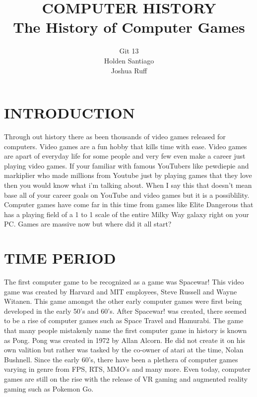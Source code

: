 \documentclass[letterpaper, 10 pt, conference]{IEEEconf}
\title{\LARGE \bf
COMPUTER HISTORY\\
\large The History of Computer Games
}
\author{Git 13\\
\small Holden Santiago\\
\small Joshua Ruff\\
}
\begin{document}
\maketitle
\thispagestyle{empty}
\pagestyle{empty}

\section{INTRODUCTION}
	Through out history there as been thousands of video games released for computers. Video games are a fun hobby that kills time with ease. Video games are apart of everyday life for some people and very few even make a career just playing video games. If your familiar with famous YouTubers like pewdiepie and markiplier who made millions from Youtube just by playing games that they love then you would know what i'm talking about. When I say this that doesn't mean base all of your career goals on YouTube and video games but it is a possiblility. Computer games have come far in this time from games like Elite Dangerous that has a playing field of a 1 to 1 scale of the entire Milky Way galaxy right on your PC. Games are massive now but where did it all start? 

\section{TIME PERIOD}

The first computer game to be recognized as a game was
Spacewar! This video game was created by Harvard and MIT
employees, Steve Russell and Wayne Witanen. This game
amongst the other early computer games were first being
developed in the early 50's and 60's. After Spacewar! was
created, there seemed to be a rise of computer games such
as Space Travel and Hamurabi. The game that many people
mistakenly name the first computer game in history is known
as Pong. Pong was created in 1972 by Allan Alcorn. He did 
not create it on his own valition but rather was tasked by
the co-owner of atari at the time, Nolan Bushnell. Since the
early 60's, there have been a plethera of computer games
varying in genre from FPS, RTS, MMO's and many more.
Even today, computer games are still on the rise with the
release of VR gaming and augmented reality gaming such
as Pokemon Go.

\end{document}
